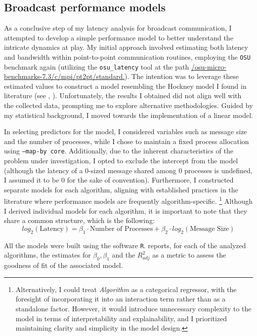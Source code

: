 \documentclass{article}
\begin{document}
\subsection{Broadcast performance models}
As a conclusive step of my latency analysis for broadcast communication, I attempted to develop a simple performance model to better understand the intricate dynamics at play. My initial approach involved estimating both latency and bandwidth within point-to-point communication routines, employing the \texttt{OSU} benchmark again (utilizing the \texttt{osu\_latency} tool at the path \url{/osu-micro-benchmarks-7.3/c/mpi/pt2pt/standard.}). The intention was to leverage these estimated values to construct a model resembling the Hockney model I found in literature (see \cite{HockneyOfficial}, \cite{Hockney2}). Unfortunately, the results I obtained did not align well with the collected data, prompting me to explore alternative methodologies.
Guided by my statistical background, I moved towards the implementation of a linear model. 

In selecting predictors for the model, I considered variables such as message size and the number of processes, while I chose to maintain a fixed process allocation using \texttt{--map-by core}. Additionally, due to the inherent characteristics of the problem under investigation, I opted to exclude the intercept from the model (although the latency of a 0-sized message shared among 0 processes is undefined, I assumed it to be 0 for the sake of convention). Furthermore, I constructed separate models for each algorithm, aligning with established practices in the literature where performance models are frequently algorithm-specific.
\footnote{Alternatively, I could treat \textit{Algorithm} as a categorical regressor, with the foresight of incorporating it into an interaction term rather than as a standalone factor. However, it would introduce unnecessary complexity to the model in terms of interpretability and explainability, and I prioritized maintaining clarity and simplicity in the model design.}
Although I derived individual models for each algorithm, it is important to note that they share a common structure, which is the following:
$$\boxed{log_2(\text{Latency}) = \beta_1 \cdot \text{Number of Processes} + \beta_2 \cdot log_2(\text{Message Size})}$$

All the models were built using the software \texttt{R}.  reports, for each of the analyzed algorithms, the estimates for $\beta_0,\beta_1 $ and the $R^2_{adj}$ as a metric to assess the goodness of fit of the associated model.
\end{document}
